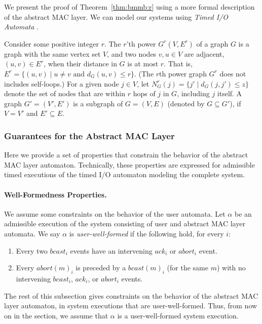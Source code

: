 




We present the 
proof of  Theorem~\ref{thm:bmmb:r} using a more formal description of the abstract MAC layer.
We can model our systems using \emph{Timed I/O Automata} \cite{TIOA2010}.

Consider some positive integer $r$.
The $r$'th power $G^r(V,E^r)$ of a graph $G$ is a graph with the same vertex set $V$, and two nodes $v,u\in V$
are adjacent, $(u,v)\in E^r$, when their distance in $G$ is at most $r$.
That is,
$E^r=\{ (u,v) \mid u\not= v \mbox{ and } d_G(u,v) \leq r\}$.
(The $r$th power  graph $G^r$ does not includes self-loops.)
For a given node $j\in V$,
let $N^r_G(j)=\{ j' \mid d_G(j,j')\leq z \}$ denote the set of nodes that are within $r$ hops of $j$
in $G$, including $j$ itself.
A graph $G'=(V',E')$ is a subgraph of $G=(V,E)$ (denoted by $G\subseteq G'$), if $V=V'$ and $E' \subseteq E$.








\subsubsection{Guarantees for the Abstract MAC Layer}
\label{sec:model:prop}

Here we provide a set of properties that constrain the
behavior of the abstract MAC layer automaton.
Technically, these properties are expressed for admissible timed
executions of the timed I/O automaton modeling the complete system.

\paragraph{Well-Formedness Properties.}
We assume some constraints on the behavior of the user automata.
Let $\alpha$ be an admissible execution of the system consisting of
user and abstract MAC layer automata.
We say $\alpha$ is {\em user-well-formed} if the following hold, for
every $i$:
\begin{enumerate}
\item
Every two $bcast_i$ events have an intervening $ack_i$ or $abort_i$ event.
\item
Every $abort(m)_i$ is preceded by a $bcast(m)_i$ (for the same $m$)
with no intervening $bcast_i$, $ack_i$, or $abort_i$ events.
\end{enumerate}

The rest of this subsection gives constraints on the behavior of the
abstract MAC layer automaton, in system executions that are
user-well-formed.
Thus, from now on in the section, we assume that $\alpha$ is a
user-well-formed system execution.

